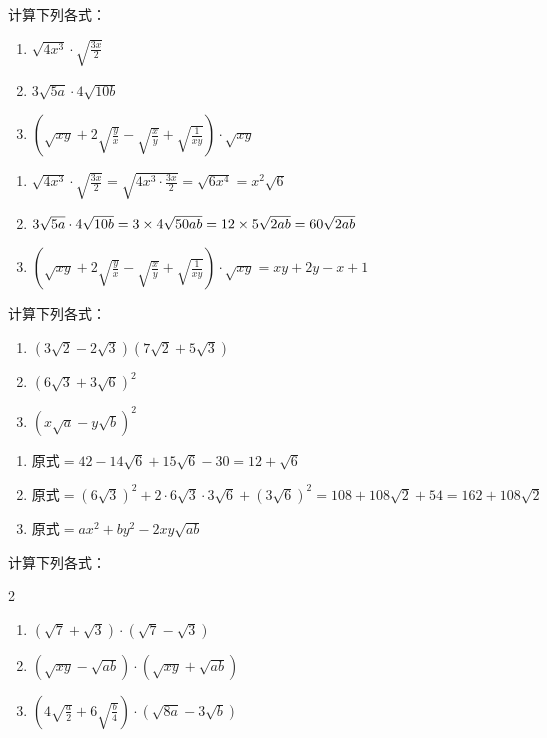 \begin{example}
    计算下列各式：
\begin{enumerate}
    \item $\sqrt{4x^3}\cdot \sqrt{\frac{3x}{2}}$
    \item $3\sqrt{5a}\cdot 4\sqrt{10b}$
\item $\left(\sqrt{xy}+2\sqrt{\frac{y}{x}}-\sqrt{\frac{x}{y}}+\sqrt{\frac{1}{xy}}\right)\cdot \sqrt{xy}$
\end{enumerate}
\end{example}

\begin{solution}
    \begin{enumerate}
        \item $\sqrt{4x^3}\cdot \sqrt{\frac{3x}{2}}=\sqrt{4x^3\cdot \frac{3x}{2}}=\sqrt{6x^4}=x^2\sqrt{6}$
        \item $3\sqrt{5a}\cdot 4\sqrt{10b}=3\times 4\sqrt{50ab}=12\times 5\sqrt{2ab}=60\sqrt{2ab}$
    \item $\left(\sqrt{xy}+2\sqrt{\frac{y}{x}}-\sqrt{\frac{x}{y}}+\sqrt{\frac{1}{xy}}\right)\cdot \sqrt{xy}=xy+2y-x+1$
    \end{enumerate}
\end{solution}


\begin{example}
    计算下列各式：
\begin{enumerate}
    \item $\left(3\sqrt{2}-2\sqrt{3}\right)\left(7\sqrt{2}+5\sqrt{3}\right)$
    \item $\left(6\sqrt{3}+3\sqrt{6}\right)^2$
    \item $\left(x\sqrt{a}-y\sqrt{b}\right)^2$
\end{enumerate}
\end{example}

\begin{solution}
    \begin{enumerate}
    \item $\text{原式}=42-14\sqrt{6}+15\sqrt{6}-30=12+\sqrt{6}$
    \item $\text{原式}=\left(6\sqrt{3}\right)^2+2\cdot 6\sqrt{3}\cdot 3\sqrt{6}+\left(3\sqrt{6}\right)^2=108+108\sqrt{2}+54=162+108\sqrt{2}$
    \item $\text{原式}=ax^2+by^2-2xy\sqrt{ab}$
\end{enumerate}
\end{solution}


\begin{example}
    计算下列各式：
\begin{multicols}{2}
    \begin{enumerate}
    \item $\left(\sqrt{7}+\sqrt{3}\right)\cdot \left(\sqrt{7}-\sqrt{3}\right)$
    \item $\left(\sqrt{xy}-\sqrt{ab}\right)\cdot \left(\sqrt{xy}+\sqrt{ab}\right)$
    \item $\left(4\sqrt{\frac{a}{2}}+6\sqrt{\frac{b}{4}}\right)\cdot \left(\sqrt{8a}-3\sqrt{b}\right)$
\end{enumerate}
\end{multicols}
\end{example}

